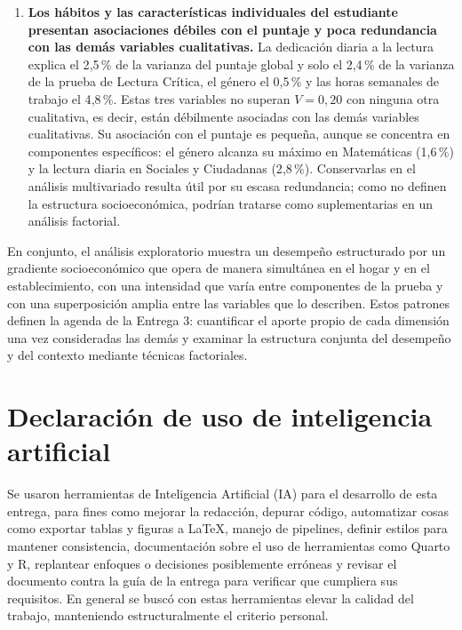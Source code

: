 \documentclass[12pt]{article}
\begin{document}
\begin{enumerate}[leftmargin=1.8em, itemsep=0.6em, topsep=0.4em]
  \item \textbf{Los hábitos y las características individuales del estudiante presentan
  asociaciones débiles con el puntaje y poca redundancia con las demás variables
  cualitativas.} La dedicación diaria a la lectura explica el 2{,}5\,\% de la varianza del
  puntaje global y solo el 2{,}4\,\% de la varianza de la prueba de Lectura Crítica, el
  género el 0{,}5\,\% y las horas semanales de trabajo el 4{,}8\,\%. Estas tres variables no
  superan $V = 0{,}20$ con ninguna otra cualitativa, es decir, están débilmente asociadas
  con las demás variables cualitativas. Su asociación con el puntaje es pequeña,
  aunque se concentra en componentes específicos: el género alcanza su máximo en Matemáticas
  (1{,}6\,\%) y la lectura diaria en Sociales y Ciudadanas (2{,}8\,\%). Conservarlas en el
  análisis multivariado resulta útil por su escasa redundancia; como no definen la estructura
  socioeconómica, podrían tratarse como suplementarias en un análisis factorial.


\end{enumerate}

En conjunto, el análisis exploratorio muestra un desempeño estructurado por un gradiente
socioeconómico que opera de manera simultánea en el hogar y en el establecimiento, con una
intensidad que varía entre componentes de la prueba y con una superposición amplia entre las
variables que lo describen. Estos patrones definen la agenda de la Entrega 3: cuantificar el
aporte propio de cada dimensión una vez consideradas las demás y examinar la estructura
conjunta del desempeño y del contexto mediante técnicas factoriales.

\newpage

\section{Declaración de uso de inteligencia artificial}
Se usaron herramientas de Inteligencia Artificial (IA) para el desarrollo de esta entrega, para fines como mejorar la redacción, 
depurar código, automatizar cosas como exportar tablas y figuras a \LaTeX, manejo de pipelines, definir estilos para mantener consistencia,
documentación sobre el uso de herramientas como Quarto y R, replantear enfoques o decisiones posiblemente erróneas y revisar
el documento contra la guía de la entrega para verificar que cumpliera sus requisitos.
En general se buscó con estas herramientas elevar la calidad del trabajo, manteniendo estructuralmente el criterio personal.
\end{document}
